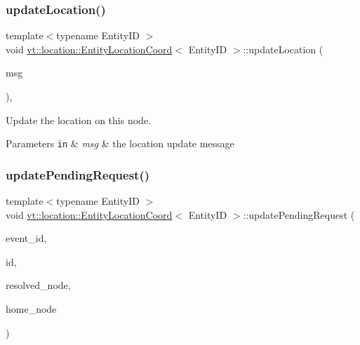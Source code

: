 \subsubsection{\texorpdfstring{update\+Location()}{updateLocation()}}
{\footnotesize\ttfamily template$<$typename Entity\+ID $>$ \\
void \hyperlink{structvt_1_1location_1_1_entity_location_coord}{vt\+::location\+::\+Entity\+Location\+Coord}$<$ Entity\+ID $>$\+::update\+Location (\begin{DoxyParamCaption}\item[{\hyperlink{structvt_1_1location_1_1_entity_location_coord_a8799cbd5fb0fb04cfdd1012fe1d5908f}{Loc\+Msg\+Type} $\ast$}]{msg }\end{DoxyParamCaption})\hspace{0.3cm}{\ttfamily [static]}, {\ttfamily [private]}}



Update the location on this node. 


\begin{DoxyParams}[1]{Parameters}
\mbox{\tt in}  & {\em msg} & the location update message \\
\hline
\end{DoxyParams}
\mbox{\label{structvt_1_1location_1_1_entity_location_coord_a96e4c5c2a943450554b17c34f05995d0}} 
\subsubsection{\texorpdfstring{update\+Pending\+Request()}{updatePendingRequest()}}
{\footnotesize\ttfamily template$<$typename Entity\+ID $>$ \\
void \hyperlink{structvt_1_1location_1_1_entity_location_coord}{vt\+::location\+::\+Entity\+Location\+Coord}$<$ Entity\+ID $>$\+::update\+Pending\+Request (\begin{DoxyParamCaption}\item[{\hyperlink{namespacevt_1_1location_aa5ccc1a42aa22b0b41fcfbbdee314dca}{Loc\+Event\+ID} const \&}]{event\+\_\+id,  }\item[{Entity\+ID const \&}]{id,  }\item[{\hyperlink{namespacevt_a866da9d0efc19c0a1ce79e9e492f47e2}{Node\+Type} const \&}]{resolved\+\_\+node,  }\item[{\hyperlink{namespacevt_a866da9d0efc19c0a1ce79e9e492f47e2}{Node\+Type} const \&}]{home\+\_\+node }\end{DoxyParamCaption})}



